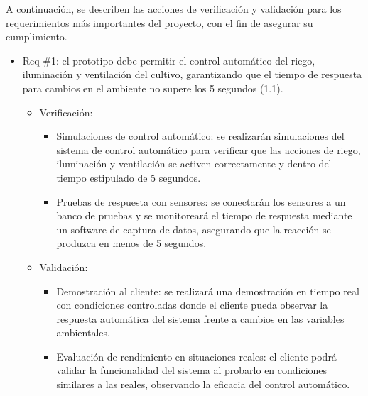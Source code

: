 \documentclass[
11pt, %
]{charter}
\begin{document}
A continuación, se describen las acciones de verificación y validación para los requerimientos más importantes del proyecto, con el fin de asegurar su cumplimiento.
\begin{itemize}
\item Req \#1: el prototipo debe permitir el control automático del riego, iluminación y ventilación del cultivo, garantizando que el tiempo de respuesta para cambios en el ambiente no supere los 5 segundos (1.1).
\begin{itemize}
    \item Verificación:
    \begin{itemize}
        \item Simulaciones de control automático: se realizarán simulaciones del sistema de control automático para verificar que las acciones de riego, iluminación y ventilación se activen correctamente y dentro del tiempo estipulado de 5 segundos.
        \item Pruebas de respuesta con sensores: se conectarán los sensores a un banco de pruebas y se monitoreará el tiempo de respuesta mediante un software de captura de datos, asegurando que la reacción se produzca en menos de 5 segundos.
    \end{itemize}
    \item Validación:
    \begin{itemize}
        \item Demostración al cliente: se realizará una demostración en tiempo real con condiciones controladas donde el cliente pueda observar la respuesta automática del sistema frente a cambios en las variables ambientales.
        \item Evaluación de rendimiento en situaciones reales: el cliente podrá validar la funcionalidad del sistema al probarlo en condiciones similares a las reales, observando la eficacia del control automático.
    \end{itemize}
\end{itemize}


\end{itemize}
\end{document}
